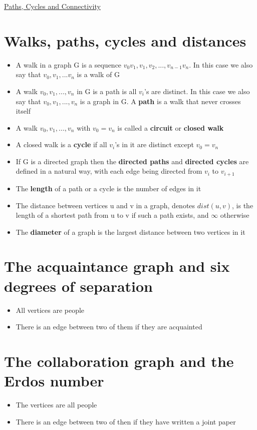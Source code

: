 \documentclass{article}[18pt]
\begin{document}
\begin{center}
\underline{\huge Paths, Cycles and Connectivity}
\end{center}
\section{Walks, paths, cycles and distances}
\begin{itemize}
	\item A walk in a graph G is a sequence $v_0v_1,v_1,v_2,...,v_{n-1}v_n$. In this case we also say that $v_0,v_1,...v_n$ is a walk of G
	\item A walk $v_0,v_1,...,v_n$ in G is a path is all $v_i$'s are distinct. In this case we also say that $v_0,v_1,...,v_n$ is a graph in G. A \textbf{path} is a walk that never crosses itself
	\item A walk $v_0,v_1,...,v_n$ with $v_0=v_n$ is called a \textbf{circuit} or \textbf{closed walk}
	\item A closed walk is a \textbf{cycle} if all $v_i$'s in it are distinct except $v_0=v_n$
	\item If G is a directed graph then the \textbf{directed paths} and \textbf{directed cycles} are defined in a natural way, with each edge being directed from $v_i$ to $v_{i+1}$
	\item The \textbf{length} of a path or a cycle is the number of edges in it
	\item The distance between vertices u and v in a graph, denotes $dist(u,v)$, is the length of a shortest path from u to v if such a path exists, and $\infty$ otherwise
	\item The \textbf{diameter} of a graph is the largest distance between two vertices in it
\end{itemize}
\section{The acquaintance graph and six degrees of separation}
\begin{itemize}
	\item All vertices are people
	\item There is an edge between two of them if they are acquainted
\end{itemize}
\section{The collaboration graph and the Erdos number}
\begin{itemize}
	\item The vertices are all people
	\item There is an edge between two of then if they have written a joint paper
\end{itemize}
\end{document}
